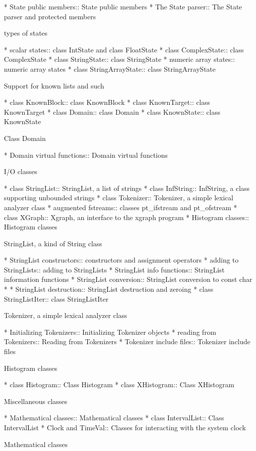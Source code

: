 * State public members::  State public members
* The State parser::  The State parser and protected members

types of states

* scalar states::   class IntState and class FloatState
* class ComplexState::  class ComplexState
* class StringState::  class StringState
* numeric array states::  numeric array states
* class StringArrayState::  class StringArrayState

Support for known lists and such

* class KnownBlock::  class KnownBlock
* class KnownTarget::  class KnownTarget
* class Domain::    class Domain
* class KnownState::  class KnownState

Class Domain

* Domain virtual functions::  Domain virtual functions

I/O classes

* class StringList::  StringList, a list of strings
* class InfString::  InfString, a class supporting unbounded strings
* class Tokenizer::  Tokenizer, a simple lexical analyzer class
* augmented fstreams::  classes pt_ifstream and pt_ofstream
* class XGraph::    Xgraph, an interface to the xgraph program
* Histogram classes::  Histogram classes

StringList, a kind of String class

* StringList constructors::  constructors and assignment operators
* adding to StringLists::  adding to StringLists
* StringList info functions::  StringList information functions
* StringList conversion::  StringList conversion to const char *
* StringList destruction::  StringList destruction and zeroing
* class StringListIter::  class StringListIter

Tokenizer, a simple lexical analyzer class

* Initializing Tokenizers::  Initializing Tokenizer objects
* reading from Tokenizers::  Reading from Tokenizers
* Tokenizer include files::  Tokenizer include files

Histogram classes

* class Histogram::  Class Histogram
* class XHistogram::  Class XHistogram

Miscellaneous classes

* Mathematical classes::  Mathematical classes
* class IntervalList::  Class IntervalList
* Clock and TimeVal::  Classes for interacting with the system clock

Mathematical classes

